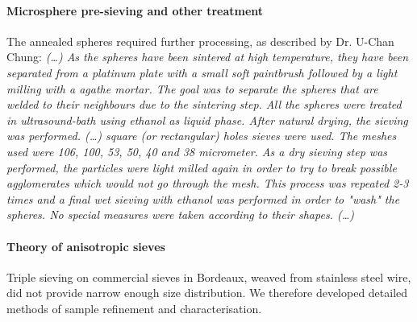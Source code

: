 \paragraph{Microsphere pre-sieving and other treatment}%
The annealed spheres required further processing, as described by {Dr.} U-Chan Chung: 
\textit{
(\ldots) As the spheres have been sintered at high temperature, they have been separated from a platinum plate with a small soft paintbrush followed by a light milling with a agathe mortar. The goal was to separate the spheres that are welded to their neighbours due to the sintering step. All the spheres were treated in ultrasound-bath using ethanol as liquid phase. After natural drying, the sieving was performed. (\ldots) square (or rectangular) holes sieves were used. The meshes used were 106, 100, 53, 50, 40 and 38 micrometer. As a dry sieving step was performed, the particles were light milled again in order to try to break possible agglomerates which would not go through the mesh. This process was repeated 2-3 times and a final wet sieving with ethanol was performed in order to "wash" the spheres. No special measures were taken according to their shapes. (\ldots) } 
\paragraph{Theory of anisotropic sieves}%
Triple sieving on commercial sieves in Bordeaux, weaved from stainless steel wire, did not provide narrow enough size distribution. We therefore developed detailed methods of sample refinement and characterisation. 

